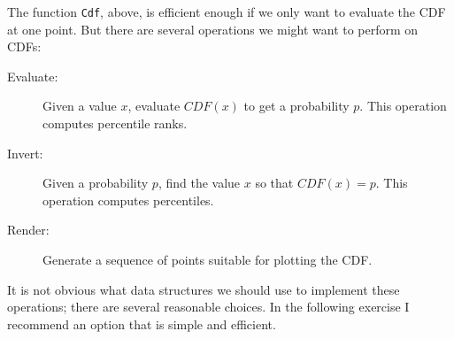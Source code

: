 \documentclass[12pt]{book}
\begin{document}
The function {\tt Cdf}, above, is efficient enough if we only want
to evaluate the CDF at one point.  But there are several operations
we might want to perform on CDFs:

\begin{description}

\item[Evaluate:] Given a value $x$, evaluate $CDF(x)$ to get a
  probability $p$.  This operation computes percentile ranks.

\item[Invert:] Given a probability $p$, find the value $x$ so that
  $CDF(x) = p$.  This operation computes percentiles.

\item[Render:] Generate a sequence of points suitable for plotting the
  CDF.

\end{description}

It is not obvious what data structures we should use to implement
these operations; there are several reasonable choices.  In the
following exercise I recommend an option that is simple and efficient.
\end{document}
